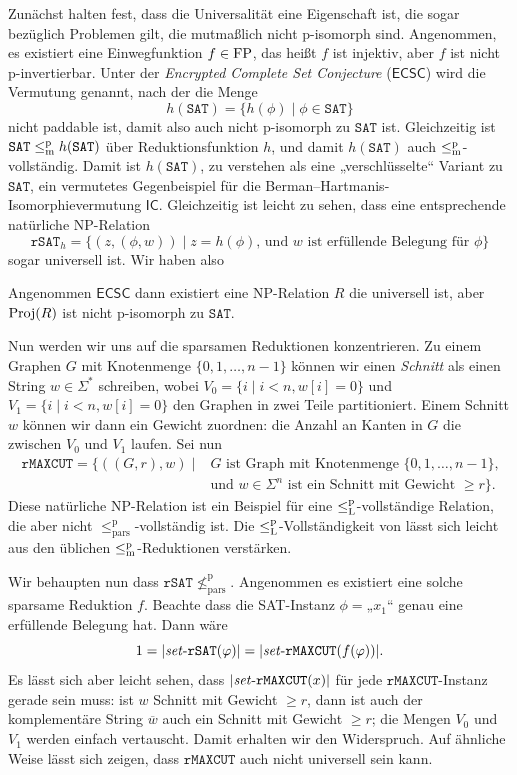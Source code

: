 Zunächst halten \textcite{agrawal_universal_1992} fest, dass die Universalität eine Eigenschaft ist, die sogar bezüglich Problemen gilt, die mutmaßlich nicht p-isomorph sind.
Angenommen, es existiert eine Einwegfunktion $f\in\mathrm{FP}$, das heißt $f$ ist injektiv, aber $f$ ist nicht p-invertierbar.
Unter der \emph{Encrypted Complete Set Conjecture} ($\mathsf{ECSC}$) wird die Vermutung genannt, nach der die Menge
\[ h(\mathtt{SAT}) = \{ h(\phi) \mid \phi\in\mathtt{SAT} \} \]
nicht paddable ist, damit also auch nicht p-isomorph zu $\mathtt{SAT}$ ist.
Gleichzeitig ist $\mathtt{SAT}\leq_\mathrm{m}^\mathrm{p} h(\mathtt{SAT})$ über Reduktionsfunktion $h$, und damit $h(\mathtt{SAT})$ auch $\leq_\mathrm{m}^\mathrm{p}$-vollständig.
Damit ist $h(\mathtt{SAT})$, zu verstehen als eine „verschlüsselte“ Variant zu $\mathtt{SAT}$, ein vermutetes Gegenbeispiel für die Berman--Hartmanis-Isomorphievermutung $\mathsf{IC}$.
Gleichzeitig ist leicht zu sehen, dass eine entsprechende natürliche NP-Relation
\[ \mathtt{rSAT}_h = \{ (z, (\phi, w)) \mid \text{$z=h(\phi)$, und $w$ ist erfüllende Belegung für $\phi$} \} \]
sogar universell ist.
Wir haben also %
\begin{observation}
    Angenommen $\mathsf{ECSC}$ dann existiert eine NP-Relation $R$ die universell ist, aber $\operatorname{Proj}(R)$ ist nicht p-isomorph zu $\mathtt{SAT}$.
\end{observation}


Nun werden wir uns auf die sparsamen Reduktionen konzentrieren.
Zu einem Graphen $G$ mit Knotenmenge $\{0,1,\dots, n-1\}$ können wir einen \emph{Schnitt} als einen String $w\in\Sigma^*$ schreiben, wobei $V_0 = \{ i \mid i<n, w[i]=0\}$ und $V_1 = \{ i \mid i<n, w[i]=0\}$ den Graphen in zwei Teile partitioniert. Einem Schnitt $w$ können wir dann ein Gewicht zuordnen: die Anzahl an Kanten in $G$ die zwischen $V_0$ und $V_1$ laufen.
Sei nun
\[ \begin{split} \mathtt{rMAXCUT} = \{ ((G, r), w) \mid {}&\text{$G$ ist Graph mit Knotenmenge $\{0,1,\dots,n-1\}$,} \\ &\text{und $w\in\Sigma^n$ ist ein Schnitt mit Gewicht $\geq r$} \}.\end{split} \]
Diese natürliche NP-Relation ist ein Beispiel für eine $\leq_\mathrm{L}^\mathrm{p}$-vollständige Relation, die aber nicht $\leq_\mathrm{pars}^\mathrm p$-vollständig ist. Die $\leq_\mathrm{L}^\mathrm{p}$-Vollständigkeit von lässt sich leicht aus den üblichen $\leq_\mathrm{m}^\mathrm{p}$-Reduktionen verstärken.

Wir behaupten nun dass $\mathtt{rSAT} \not\leq_\mathrm{pars}^\mathrm p$. Angenommen es existiert eine solche sparsame Reduktion $f$. Beachte dass die SAT-Instanz $\phi={}$„$x_1$“ genau eine erfüllende Belegung hat. Dann wäre
\[ 1=|\mathit{set}\text{-}{}\mathtt{rSAT}(\varphi)|=|\mathit{set}\text{-}{}\mathtt{rMAXCUT}(f(\varphi))|. \]
Es lässt sich aber leicht sehen, dass $|\mathit{set}\text{-}{}\mathtt{rMAXCUT}(x)|$ für jede $\mathtt{rMAXCUT}$-Instanz gerade sein muss: ist $w$ Schnitt mit Gewicht $\geq r$, dann ist auch der komplementäre String $\overline{w}$ auch ein Schnitt mit Gewicht $\geq r$; die Mengen $V_0$ und $V_1$ werden einfach vertauscht.
Damit erhalten wir den Widerspruch. Auf ähnliche Weise lässt sich zeigen, dass $\mathtt{rMAXCUT}$ auch nicht universell sein kann.

